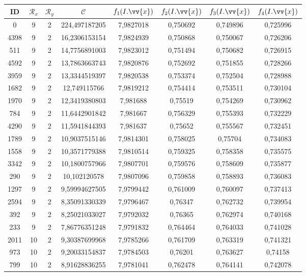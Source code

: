 \scriptsize
\begin{longtable}{|c|c|c|c|c|c|c|c|}
\hline
ID & $\mathscr{R}_x$ & $\mathscr{R}_y$ & $\mathscr{C}$ & $f_1(I.\vv{x})$ & $f_2(I.\vv{x})$ & $f_3(I.\vv{x})$ & $f_4(I.\vv{x})$ \\
\hline
0 & 9 & 2 & 224,497187205 & 7,9827018 & 0,750692 & 0,749896 & 0,725996 \\
4398 & 9 & 2 & 16,2306153154 & 7,9824939 & 0,750868 & 0,750067 & 0,726206 \\
511 & 9 & 2 & 14,7756891003 & 7,9823012 & 0,751494 & 0,750682 & 0,726915 \\
4592 & 9 & 2 & 13,7863663743 & 7,9820876 & 0,752692 & 0,751855 & 0,728266 \\
3959 & 9 & 2 & 13,3344519397 & 7,9820538 & 0,753374 & 0,752504 & 0,728988 \\
1682 & 9 & 2 & 12,749115766 & 7,9819212 & 0,754414 & 0,753511 & 0,730104 \\
1970 & 9 & 2 & 12,3419380803 & 7,981688 & 0,75519 & 0,754269 & 0,730962 \\
784 & 9 & 2 & 11,6442901842 & 7,981667 & 0,756329 & 0,755393 & 0,732229 \\
4290 & 9 & 2 & 11,5941844393 & 7,981637 & 0,75652 & 0,755567 & 0,732451 \\
1789 & 9 & 2 & 10,9037515146 & 7,9814301 & 0,758025 & 0,75704 & 0,734083 \\
1558 & 9 & 2 & 10,3571779388 & 7,9810514 & 0,759325 & 0,758358 & 0,735575 \\
3342 & 9 & 2 & 10,1800757966 & 7,9807701 & 0,759576 & 0,758609 & 0,735877 \\
290 & 9 & 2 & 10,102120578 & 7,9807096 & 0,759858 & 0,758893 & 0,736083 \\
1297 & 9 & 2 & 9,59994627505 & 7,9799442 & 0,761009 & 0,760097 & 0,737413 \\
2594 & 9 & 2 & 8,35091330339 & 7,9796467 & 0,76347 & 0,762732 & 0,739954 \\
392 & 9 & 2 & 8,25021033027 & 7,9792032 & 0,76365 & 0,762974 & 0,740168 \\
233 & 9 & 2 & 7,86776351248 & 7,9791832 & 0,764464 & 0,764033 & 0,741028 \\
2011 & 10 & 2 & 9,30387699968 & 7,9785266 & 0,761709 & 0,763319 & 0,741321 \\
973 & 10 & 2 & 9,20033154837 & 7,9784503 & 0,76201 & 0,763627 & 0,74158 \\
799 & 10 & 2 & 8,91628836255 & 7,9781041 & 0,762478 & 0,764141 & 0,742078 \\

\end{longtable}
